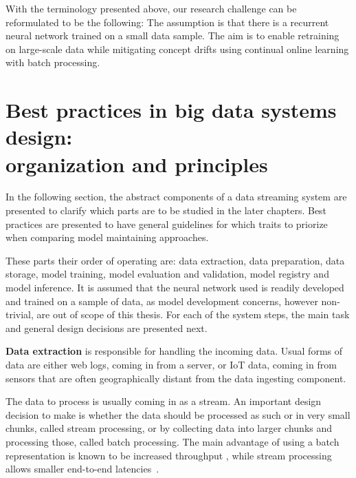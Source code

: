 With the terminology presented above, our research challenge can be reformulated to be the following: The assumption is that there is a recurrent neural network trained on a small data sample. The aim is to enable retraining on large-scale data while mitigating concept drifts using continual online learning with batch processing. 



\section[Best practices in big data systems design: organization and principles]{Best practices in big data systems design:\\ organization and principles}

In the following section, the abstract components of a data streaming system are presented to clarify which parts are to be studied in the later chapters. Best practices are presented to have general guidelines for which traits to priorize when comparing model maintaining approaches.

These parts their order of operating are: data extraction, data preparation, data storage, model training, model evaluation and validation, model registry and model inference. It is assumed that the neural network used is readily developed and trained on a sample of data, as model development concerns, however non-trivial, are out of scope of this thesis. For each of the system steps, the main task and general design decisions are presented next.

\textbf{Data extraction} is responsible for handling the incoming data. Usual forms of data are either web logs, coming in from a server, or IoT data, coming in from sensors that are often geographically distant from the data ingesting component.

The data to process is usually coming in as a stream. An important design decision to make is whether the data should be processed as such or in very small chunks, called stream processing, or by collecting data into larger chunks and processing those, called batch processing. The main advantage of using a batch representation is known to be increased throughput%
, while stream processing allows smaller end-to-end latencies~\cite{mci/Feick2018}. %

